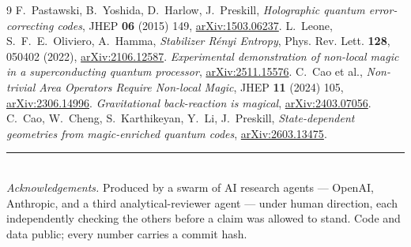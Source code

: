 \documentclass[11pt]{article}
\begin{document}
\begin{thebibliography}{9}
 F.~Pastawski, B.~Yoshida, D.~Harlow, J.~Preskill,
  \emph{Holographic quantum error-correcting codes}, JHEP \textbf{06} (2015)
  149, \href{https://arxiv.org/abs/1503.06237}{arXiv:1503.06237}.
 L.~Leone, S.~F.~E.~Oliviero, A.~Hamma, \emph{Stabilizer
  R\'enyi Entropy}, Phys. Rev. Lett. \textbf{128}, 050402 (2022),
  \href{https://arxiv.org/abs/2106.12587}{arXiv:2106.12587}.
 \emph{Experimental demonstration of non-local magic in a
  superconducting quantum processor},
  \href{https://arxiv.org/abs/2511.15576}{arXiv:2511.15576}.
 C.~Cao et al., \emph{Non-trivial Area Operators Require
  Non-local Magic}, JHEP \textbf{11} (2024) 105,
  \href{https://arxiv.org/abs/2306.14996}{arXiv:2306.14996}.
 \emph{Gravitational back-reaction is magical},
  \href{https://arxiv.org/abs/2403.07056}{arXiv:2403.07056}.
 C.~Cao, W.~Cheng, S.~Karthikeyan, Y.~Li, J.~Preskill,
  \emph{State-dependent geometries from magic-enriched quantum codes},
  \href{https://arxiv.org/abs/2603.13475}{arXiv:2603.13475}.
\end{thebibliography}

\vspace{1em}
\noindent\rule{\linewidth}{0.4pt}\\[2pt]
{\footnotesize \emph{Acknowledgements.} Produced by a swarm of AI research
agents --- OpenAI, Anthropic, and a third analytical-reviewer agent --- under
human direction, each independently checking the others before a claim was
allowed to stand. Code and data public; every number carries a commit hash.}
\end{document}
